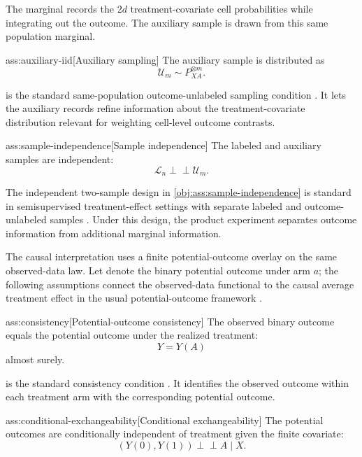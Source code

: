 The marginal  records the \(2d\) treatment-covariate cell probabilities while integrating out the outcome. The auxiliary sample  is drawn from this same population marginal.

\begin{assumptionv}{ass:auxiliary-iid}[Auxiliary sampling]
The auxiliary sample is distributed as
\[
\mathcal U_m \sim P_{XA}^{\otimes m}.
\]
\end{assumptionv}

 is the standard same-population outcome-unlabeled sampling condition \citep{ChakraborttyDai2024}. It lets the auxiliary records refine information about the treatment-covariate distribution relevant for weighting cell-level outcome contrasts.

\begin{assumptionv}{ass:sample-independence}[Sample independence]
The labeled and auxiliary samples are independent:
\[
\mathcal L_n \perp\!\!\!\perp \mathcal U_m .
\]
\end{assumptionv}

The independent two-sample design in \cref{obj:ass:sample-independence} is standard in semisupervised treatment-effect settings with separate labeled and outcome-unlabeled samples \citep{ChakraborttyDai2024}. Under this design, the product experiment separates outcome information from additional marginal information.

The causal interpretation uses a finite potential-outcome overlay on the same observed-data law. Let  denote the binary potential outcome under arm \(a\); the following assumptions connect the observed-data functional to the causal average treatment effect in the usual potential-outcome framework \citep{Rubin1974,ImbensRubin2015}.

\begin{assumptionv}{ass:consistency}[Potential-outcome consistency]
The observed binary outcome equals the potential outcome under the realized treatment:
\[
Y = Y(A)
\]
almost surely.
\end{assumptionv}

 is the standard consistency condition \citep{ZengBalakrishnanHanKennedy2024}. It identifies the observed outcome within each treatment arm with the corresponding potential outcome.

\begin{assumptionv}{ass:conditional-exchangeability}[Conditional exchangeability]
The potential outcomes are conditionally independent of treatment given the finite covariate:
\[
(Y(0),Y(1)) \perp\!\!\!\perp A \mid X .
\]
\end{assumptionv}

